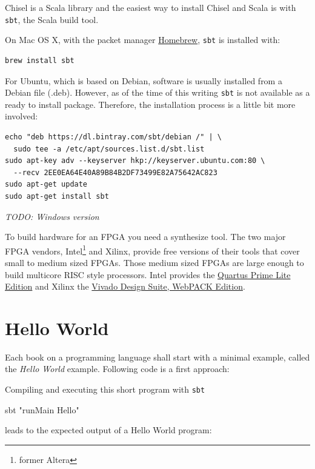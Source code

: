 \documentclass[%
    10pt, %
    headinclude, footexclude,
    openright, %
    notitlepage,
    cleardoubleempty,
    headsepline,
    pointlessnumbers,
    bibtotoc, idxtotoc,
    ]{scrbook}
\newcommand{\code}[1]{{\small{\texttt{#1}}}}
\newcommand{\todo}[1]{{\emph{TODO: #1}}}
\newcommand{\myref}[2]{\href{#1}{#2}}
\begin{document}
Chisel is a Scala library and the easiest way to install Chisel and Scala is
with \code{sbt}, the Scala build tool.

On Mac OS X, with the packet manager \myref{https://brew.sh/}{Homebrew},
\code{sbt} is installed with:

\begin{verbatim}
brew install sbt
\end{verbatim}

For Ubuntu, which is based on Debian, software is usually installed from a
Debian file (.deb). However, as of the time of this writing \code{sbt} is not
available as a ready to install package. Therefore, the installation process
is a little bit more involved:
\begin{verbatim}
echo "deb https://dl.bintray.com/sbt/debian /" | \
  sudo tee -a /etc/apt/sources.list.d/sbt.list
sudo apt-key adv --keyserver hkp://keyserver.ubuntu.com:80 \
  --recv 2EE0EA64E40A89B84B2DF73499E82A75642AC823
sudo apt-get update
sudo apt-get install sbt
\end{verbatim}

\todo{Windows version}

To build hardware for an FPGA you need a synthesize tool. The two major
FPGA vendors, Intel\footnote{former Altera} and Xilinx, provide free versions of
their tools that cover small to medium sized FPGAs. Those medium sized
FPGAs are large enough to build multicore RISC style processors.
Intel provides the \myref{https://www.altera.com/products/design-software/fpga-design/quartus-prime/download.html}{Quartus Prime Lite Edition} and Xilinx the
\myref{https://www.xilinx.com/products/design-tools/vivado/vivado-webpack.html}{Vivado Design Suite, WebPACK Edition}.

\section{Hello World}

Each book on a programming language shall start with a minimal example,
called the \emph{Hello World} example. Following code is a first approach:





Compiling and executing this short program with \code{sbt}

\begin{chisel}
sbt "runMain Hello"
\end{chisel}

leads to the expected output of a Hello World program:
\end{document}
